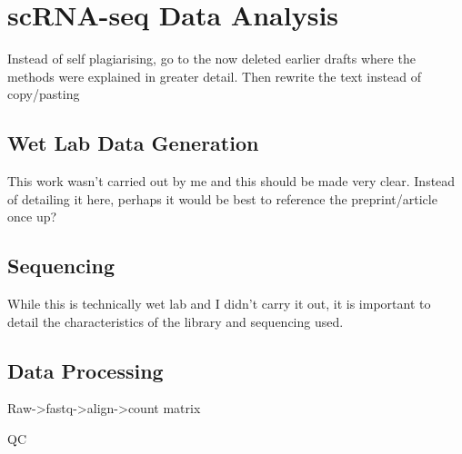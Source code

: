 \section{scRNA-seq Data Analysis}

Instead of self plagiarising, go to the now deleted earlier drafts where the methods were explained in greater detail. Then rewrite the text instead of copy/pasting

\subsection*{Wet Lab Data Generation}

This work wasn't carried out by me and this should be made very clear. Instead of detailing it here, perhaps it would be best to reference the preprint/article once up?

\subsection*{Sequencing}

While this is technically wet lab and I didn't carry it out, it is important to detail the characteristics of the library and sequencing used.


\subsection*{Data Processing}
Raw->fastq->align->count matrix

QC

